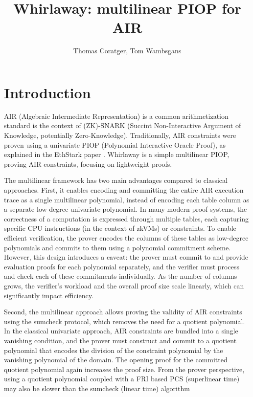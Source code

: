 \documentclass{article}
\title{Whirlaway: multilinear PIOP for AIR}
\author{Thomas Coratger, Tom Wambsgans}
\date{}
\begin{document}
\maketitle

\section{Introduction}

AIR (Algebraic Intermediate Representation) is a common arithmetization standard is the context of (ZK)-SNARK (Succint Non-Interactive Argument of Knowledge, potentially Zero-Knowledge). Traditionally, AIR constraints were proven using a univariate PIOP (Polynomial Interactive Oracle Proof), as explained in the EthStark paper \cite{eth_stark}.
Whirlaway is a simple multilinear PIOP, proving AIR constraints, focusing on lightweight proofs. 

The multilinear framework has two main advantages compared to classical approaches. First, it enables encoding and committing the entire AIR execution trace as a single multilinear polynomial, instead of encoding each table column as a separate low-degree univariate polynomial. In many modern proof systems, the correctness of a computation is expressed through multiple tables, each capturing specific CPU instructions (in the context of zkVMs) or constraints. To enable efficient verification, the prover encodes the columns of these tables as low-degree polynomials and commits to them using a polynomial commitment scheme. However, this design introduces a caveat: the prover must commit to and provide evaluation proofs for each polynomial separately, and the verifier must process and check each of these commitments individually. As the number of columns grows, the verifier’s workload and the overall proof size scale linearly, which can significantly impact efficiency.

Second, the multilinear approach allows proving the validity of AIR constraints using the sumcheck protocol, which removes the need for a quotient polynomial. In the classical univariate approach, AIR constraints are bundled into a single vanishing condition, and the prover must construct and commit to a quotient polynomial that encodes the division of the constraint polynomial by the vanishing polynomial of the domain. The opening proof for the committed quotient polynomial again increases the proof size. From the prover perspective, using a quotient polynomial coupled with a FRI based PCS (superlinear time) may also be slower than the sumcheck (linear time) algorithm
\end{document}
